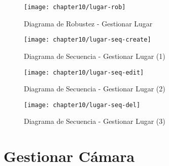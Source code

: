  \begin{landscape}
        \begin{figure}[H]
        \centering
        \texttt{[image: chapter10/lugar-rob]}
        \caption{Diagrama de Robustez - Gestionar Lugar}
        \label{fig:lugar-rob}
    \end{figure}
    
    \begin{figure}[H]
        \centering
        \texttt{[image: chapter10/lugar-seq-create]}
        \caption{Diagrama de Secuencia - Gestionar Lugar (1)}
        \label{fig:lugar-seq-create}
    \end{figure}
    
    \begin{figure}[H]
        \centering
        \texttt{[image: chapter10/lugar-seq-edit]}
        \caption{Diagrama de Secuencia - Gestionar Lugar (2)}
        \label{fig:lugar-seq-edit}
    \end{figure}
    
    \begin{figure}[H]
        \centering
        \texttt{[image: chapter10/lugar-seq-del]}
        \caption{Diagrama de Secuencia - Gestionar Lugar (3)}
        \label{fig:lugar-seq-del}
    \end{figure}
 \end{landscape}

\section{Gestionar Cámara}

